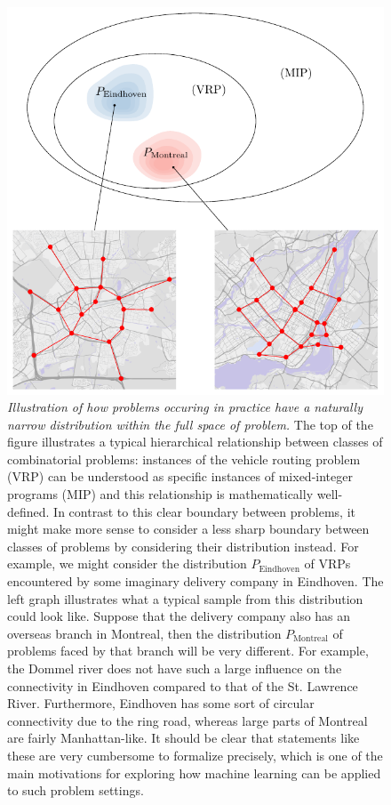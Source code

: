 \documentclass[a4paper]{report}
\theoremstyle{definition}
\theoremstyle{plain}
\begin{document}
\begin{figure}
  \centering
  \includegraphics[scale=1]{figures/problem-distribution.pdf}
  \caption{\emph{Illustration of how problems occuring in practice have a
      naturally narrow distribution within the full space of problem.}
    The top of the figure illustrates a typical hierarchical relationship between classes
    of combinatorial problems: instances of the vehicle routing problem (VRP)
    can be understood as specific instances of mixed-integer programs (MIP) and this relationship is mathematically well-defined.
    In contrast to this clear boundary between problems, it might make more
    sense to consider a less sharp boundary between classes of problems by
    considering their distribution instead.
    For example, we might consider the distribution $P_\mathrm{Eindhoven}$ of
    VRPs encountered by some imaginary delivery company in Eindhoven. The left graph
    illustrates what a typical sample from this distribution could look like.
    Suppose that the delivery company also has an overseas branch in Montreal,
    then the distribution $P_\mathrm{Montreal}$ of
    problems faced by that branch will be very different.
    For example, the Dommel river does not have such a large influence on the
    connectivity in Eindhoven compared to that of the St. Lawrence River.
    Furthermore, Eindhoven has some sort of circular connectivity due to the
    ring road, whereas large parts of Montreal are fairly Manhattan-like. It
    should be clear that statements like these are very cumbersome to formalize
    precisely, which is one of the main motivations for exploring how machine
    learning can be applied to such problem settings.}\label{fig:problem-distribution}
\end{figure}
\end{document}
